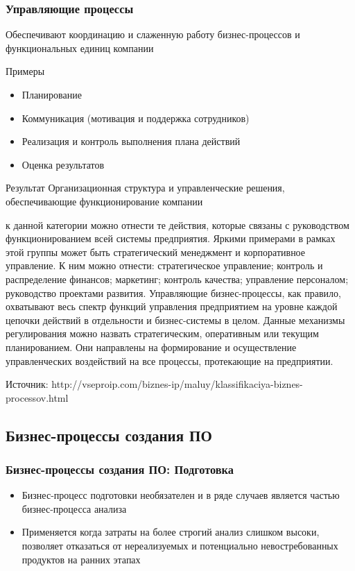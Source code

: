 \documentclass{../industrial-development}
\begin{document}
\begin{frame} \frametitle{Управляющие процессы}
	\begin{block}{}
		Обеспечивают координацию и слаженную работу бизнес-процессов и функциональных единиц компании
	\end{block}
	\begin{block}{Примеры}
		\begin{itemize}
		\item Планирование
		\item Коммуникация (мотивация и поддержка сотрудников)
		\item Реализация и контроль выполнения плана действий
		\item Оценка результатов
		\end{itemize}
	\end{block}
	\begin{block}{Результат}
		Организационная структура и управленческие решения, обеспечивающие функционирование компании
	\end{block}
\end{frame}
\lecturenotes
к данной категории можно отнести те действия, которые связаны с руководством функционированием всей системы предприятия. Яркими примерами в рамках этой группы может быть стратегический менеджмент и корпоративное управление. К ним можно отнести: стратегическое управление; контроль и распределение финансов; маркетинг; контроль качества; управление персоналом; руководство проектами развития. Управляющие бизнес-процессы, как правило, охватывают весь спектр функций управления предприятием на уровне каждой цепочки действий в отдельности и бизнес-системы в целом. Данные механизмы регулирования можно назвать стратегическим, оперативным или текущим планированием. Они направлены на формирование и осуществление управленческих воздействий на все процессы, протекающие на предприятии.

Источник: http://vseproip.com/biznes-ip/maluy/klassifikaciya-biznes-processov.html

\subsection{Бизнес-процессы создания ПО}


\begin{frame} \frametitle{Бизнес-процессы создания ПО: Подготовка}
	\begin{itemize}
		\item Бизнес-процесс подготовки необязателен и в ряде случаев является частью бизнес-процесса анализа
		\item Применяется когда затраты на более строгий анализ слишком высоки, позволяет отказаться от нереализуемых и потенциально невостребованных продуктов на ранних этапах
	\end{itemize}
\end{frame}
\lecturenotes
\end{document}
